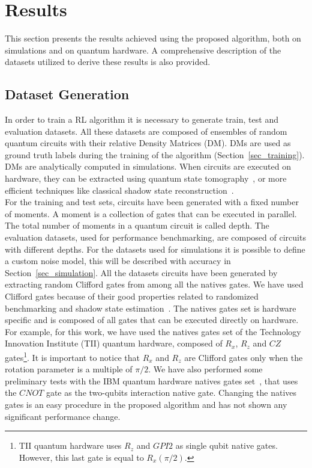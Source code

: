 \documentclass[referee,sn-basic]{sn-jnl} %
\begin{document}
\section{Results} \label{sec_results}
This section presents the results achieved using the proposed algorithm, both on simulations and on quantum hardware. 
A comprehensive description of the datasets utilized to derive these results is also provided.

\subsection{Dataset Generation}\label{sec_dataset}
In order to train a RL algorithm it is necessary to generate train, test and evaluation datasets.
All these datasets are composed of ensembles of random quantum circuits with their relative Density Matrices (DM). 
DMs are used as ground truth labels during the training of the algorithm (Section~\ref{sec_training}). 
DMs are analytically computed in simulations.  When circuits are executed on hardware, they can be extracted using quantum state 
tomography~\cite{PhysRevLett.109.120403}, or more efficient techniques like classical shadow state 
reconstruction~\cite{PRXQuantum.2.010307, Eisert_2020, PRXQuantum.2.030348}.\\ 
For the training and test sets, circuits have been generated with a fixed number of moments. 
A moment is a collection of gates that can be executed in parallel. The total number of moments in a quantum circuit is called depth.  
The evaluation datasets, used for performance benchmarking, are composed of circuits with different depths. 
For the datasets used for simulations it is possible to define a custom noise model, this will be described with accuracy in Section~\ref{sec_simulation}. 
All the datasets circuits have been generated by extracting random Clifford gates from among all the natives gates. 
We have used Clifford gates because of their good properties related to randomized benchmarking and shadow state estimation~\cite{2019npj, PhysRevA.77.012307, Eisert_2020, PRXQuantum.2.030348}.
The natives gates set is hardware specific and is composed of all gates that can be executed directly on hardware. 
For example, for this work, we have used the natives gates set of the Technology Innovation Institute (TII) quantum hardware, 
composed of $R_x$, $R_z$ and $CZ$ gates\footnote{TII quantum hardware uses $R_z$ and $GPI2$ as single qubit native gates. 
However, this last gate is equal to $R_x(\pi/2)$.}. It is important to notice that $R_x$ and $R_z$ are Clifford gates only when the rotation parameter 
is a multiple of $\pi/2$. We have also performed some preliminary tests with the IBM quantum hardware natives gates set~\cite{Santos_2016}, 
that uses the $CNOT$ gate as the two-qubits interaction native gate. Changing the natives gates is an easy procedure in the proposed algorithm 
and has not shown any significant performance change.
\end{document}
